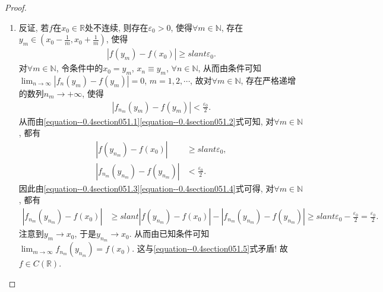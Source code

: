 \documentclass[../../main.tex]{subfiles}
\begin{document}
\begin{proof}
\begin{enumerate}
\item 反证, 若\(f\)在\(x_0\in \mathbb{R}\)处不连续, 则存在\(\varepsilon_0 > 0\), 使得\(\forall m\in \mathbb{N}\), 存在\(y_m\in (x_0 - \frac{1}{m}, x_0 + \frac{1}{m})\), 使得
\begin{align}
|f(y_m) - f(x_0)| \geqslant slant \varepsilon_0. \label{equation--0.4section051.1}
\end{align}
对\(\forall m\in \mathbb{N}\), 令条件中的\(x_0 = y_m\), \(x_n\equiv y_m\), \(\forall n\in \mathbb{N}\), 从而由条件可知\(\lim_{n\rightarrow \infty}|f_n(y_m) - f(y_m)| = 0\), \(m = 1,2,\cdots\),
故对\(\forall m\in \mathbb{N}\), 存在严格递增的数列\(n_m\rightarrow +\infty\), 使得
\begin{align}
|f_{n_m}(y_m) - f(y_m)| < \frac{\varepsilon_0}{2}. \label{equation--0.4section051.2}
\end{align}
从而由\eqref{equation--0.4section051.1}\eqref{equation--0.4section051.2}式可知, 对\(\forall m\in \mathbb{N}\), 都有
\begin{align}
|f(y_{n_m}) - f(x_0)| &\geqslant slant \varepsilon_0, \label{equation--0.4section051.3}\\
|f_{n_m}(y_{n_m}) - f(y_{n_m})| &< \frac{\varepsilon_0}{2}. \label{equation--0.4section051.4}
\end{align}
因此由\eqref{equation--0.4section051.3}\eqref{equation--0.4section051.4}式可得, 对\(\forall m\in \mathbb{N}\), 都有
\begin{align}
|f_{n_m}(y_{n_m}) - f(x_0)| &\geqslant slant |f(y_{n_m}) - f(x_0)| - |f_{n_m}(y_{n_m}) - f(y_{n_m})| \geqslant slant \varepsilon_0 - \frac{\varepsilon_0}{2} = \frac{\varepsilon_0}{2}. \label{equation--0.4section051.5}
\end{align}
注意到\(y_m\rightarrow x_0\), 于是\(y_{n_m}\rightarrow x_0\). 从而由已知条件可知\(\lim_{m\rightarrow \infty}f_{n_m}(y_{n_m}) = f(x_0)\). 这与\eqref{equation--0.4section051.5}式矛盾! 故\(f\in C(\mathbb{R})\). 
\end{enumerate}
\end{proof}
\end{document}
